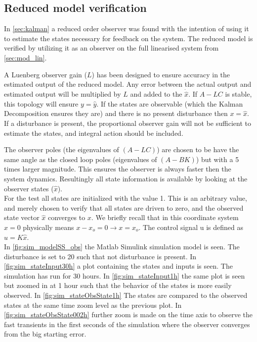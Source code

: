\subsection{Reduced model verification}
In \cref{sec:kalman} a reduced order observer was found with the intention of using it to estimate the states necessary for feedback on the system. The reduced model is verified by utilizing it as an observer on the full linearised system from \cref{sec:mod_lin}.

A Luenberg observer gain ($L$) has been designed to ensure accuracy in the estimated output of the reduced model. Any error between the actual output and estimated output will be multiplied by $L$ and added to the $\dot{\hat{x}}$. If $A-LC$ is stable, this topology will ensure $y = \hat{y}$. If the states are observable (which the Kalman Decomposition ensures they are) and there is no present disturbance then $x=\hat{x}$. If a disturbance is present, the proportional observer gain will not be sufficient to estimate the states, and integral action should be included.

The observer poles (the eigenvalues of $(A-LC)$) are chosen to be have the same angle as the closed loop poles (eigenvalues of $(A-BK)$) but with a 5 times larger magnitude. This ensures the observer is always faster then the system dynamics. Resultingly all state information is available by looking at the observer states ($\hat{x}$).\\

For the test all states are initialized with the value 1. This is an arbitrary value, and merely chosen to verify that all states are driven to zero, and the observed state vector $\hat{x}$ converges to $x$. We briefly recall that in this coordinate system $x=0$ physically means $x-x_o = 0 \rightarrow x=x_o$. The control signal u is defined as $u=K\hat{x}$.\\

In \cref{fig:sim_modelSS_obs} the Matlab Simulink simulation model is seen. The disturbance is set to 20 such that not disturbance is present. In \cref{fig:sim_stateInput30h} a plot containing the states and inputs is seen. The simulation has run for 30 hours. In \cref{fig:sim_stateInput1h} the same plot is seen but zoomed in at 1 hour such that the behavior of the states is more easily observed. In \cref{fig:sim_stateObsState1h} The states are compared to the observed states at the same time zoom level as the previous plot. In \cref{fig:sim_stateObsState002h} further zoom is made on the time axis to observe the fast transients in the first seconds of the simulation where the observer converges from the big starting error.

